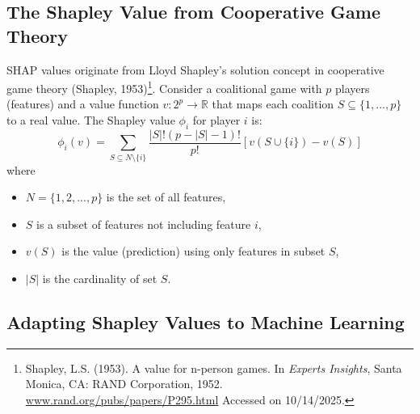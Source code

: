 \subsection{The Shapley Value from Cooperative Game Theory}
%
SHAP values originate from Lloyd Shapley's solution concept in cooperative game theory (Shapley, 1953)\footnote{Shapley, L.S. (1953). A value for n-person games. In \textit{Experts Insights}, Santa Monica, CA: RAND Corporation, 1952. \href{https://www.rand.org/pubs/papers/P295.html}{www.rand.org/pubs/papers/P295.html} Accessed on 10/14/2025.}. Consider a coalitional game with $p$ players (features) and a value function $v: 2^p \rightarrow \mathbb{R}$ that maps each coalition $S \subseteq \{1, ..., p\}$ to a real value. The Shapley value $\phi_i$ for player $i$ is:
%
\begin{equation}
\phi_i(v) = \sum_{S \subseteq N \setminus \{i\}} \frac{|S|!(p - |S| - 1)!}{p!} \left[v(S \cup \{i\}) - v(S)\right]
\label{eq:shapley_original}
\end{equation}
%
where 
\begin{itemize}
    \item $N = \{1, 2, ..., p\}$ is the set of all features,
    \item $S$ is a subset of features not including feature $i$,
    \item $v(S)$ is the value (prediction) using only features in subset $S$,
    \item $|S|$ is the cardinality of set $S$.
\end{itemize}

\subsection{Adapting Shapley Values to Machine Learning}

